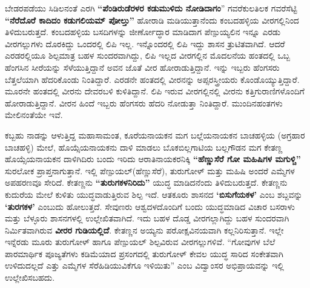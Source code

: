 ಬೇಡರಪಡೆಯು ಸಿಡಿಲನಂತೆ ಎರಗಿ \textbf{“ಪೆಂಡಿರುಡೆರಳರ ಕಡುಮುಳಿದು ನೋಡಿದಾಗಂ}” ಗವರೆಕುಲತಿಲಕ ಗವರೆಸೆಟ್ಟಿ \textbf{“ನೆರೆದೊರೆ ಕಾದಿದಂ ಕಡುಗಲಿಯಮ್ ಪೋಲ್ತು”} ಹೋರಾಡಿ ಮಡಿಯುತ್ತಾನೆಂದು ಕಂಬದಹಳ್ಳಿಯ ವೀರಗಲ್ಲಿನಿಂದ ತಿಳಿದು\-ಬರುತ್ತದೆ. ಕಂಬದಹಳ್ಳಿಯ ಬಸದಿಗಳನ್ನು ಜೀರ್ಣೋದ್ಧಾರ ಮಾಡಿದಾಗ ಪೆಣ್ಪುಯ್ಯಲಿನ ಇನ್ನೂ ಎರಡು ವೀರಗಲ್ಲುಗಳು ದೊರಕಿದ್ದು ಒಂದರಲ್ಲಿ ಲಿಪಿ ಇಲ್ಲ. ಇನ್ನೊಂದರಲ್ಲಿ ಲಿಪಿ ಇದ್ದು ಶಾಸನ ತ್ರುಟಿತವಾಗಿದೆ. ಆದರೆ ಎರಡರಲ್ಲಿಯೂ ಶಿಲ್ಪಮಾತ್ರ ಬಹಳ ಸುಂದರವಾಗಿದ್ದು, ಲಿಪಿ ಇಲ್ಲದ ವೀರಗಲ್ಲಿನ ಮೊದಲನೆಯ ಹಂತದಲ್ಲಿ ಒಬ್ಬ ಹೆಂಗಸಿನ ಸೀರೆಯನ್ನು ಸೆಳೆಯುತ್ತಿದ್ದಾನೆ ಅವನ ಜೊತೆ ವೀರ ಹೋರಾಡುತ್ತಿದ್ದಾನೆ. ಇನ್ನು ಇಬ್ಬರು ಹೆಂಗಸರು ಬೆತ್ತಲೆಯಾಗಿ ಹೆದರಿಕೊಂಡು ನಿಂತಿದ್ದಾರೆ. ಎರಡನೇ ಹಂತದಲ್ಲಿ ವೀರನನ್ನು ಅಪ್ಸರಸ್ತ್ರೀಯರು ಕೊಂಡೊಯ್ಯುತ್ತಿದ್ದಾರೆ. ಮೂರನೇ ಹಂತದಲ್ಲಿ ವೀರನು ದೇವರಬಳಿ ಕುಳಿತಿದ್ದಾನೆ. ಲಿಪಿ ಇರುವ ವೀರಗಲ್ಲಿನಲ್ಲಿ ವೀರನು ಕತ್ತಿಗುರಾಣಿಗಳೊಂದಿಗೆ ಹೋರಾಡುತ್ತಿದ್ದಾನೆ. ವೀರನ ಹಿಂದೆ ಇಬ್ಬರು ಹೆಂಗಸರು ಹೆದರಿ ನೋಡುತ್ತಾ ನಿಂತಿದ್ದಾರೆ. ಮುಂದಿನಹಂತಗಳು ಮೇಲಿನಂತೆಯೇ ಇವೆ.

ಕಬ್ಬಹು ನಾಡನ್ನು ಆಳುತ್ತಿದ್ದ ಮಹಾಸಾಮಂತ, ಕೂರೆಯನಾಯಕನ ಮಗ ಬಲ್ಲೆಯನಾಯಕನ ಬಾಚಹಳ್ಳಿಯ (ಅಗ್ರಹಾರ ಬಾಚಹಳ್ಳಿ) ಮೇಲೆ, ಹೊಯ್ಸೆಯನಾಯಕನು ದಾಳಿ ಮಾಡಲು ಬೊಕಬಿಲ್ಲಗಾಟಿಯ ಬಲ್ಲಗೌಡನ ಮಗ ಕೇತಣ್ಣ ಹೊಯ್ಸೆಯನಾಯಕನ ದಾಳಿಗಿದಿರು ಬಂದು ಇರಿದು ಆರಾತಿನಾಯಕರನಿಕ್ಕಿ \textbf{“ಹೆಣ್ಣುಸೆರೆ ಗೋ ಮಹಿಷಿಗಳ ಮಗುಳ್ಚಿ”} ಸುರಲೋಕ ಪ್ರಾಪ್ತನಾಗುತ್ತಾನೆ. ಇಲ್ಲಿ ಪೆಣ್ಪುಯಲ್​(ಹೆಣ್ಣುಸೆರೆ), ತುರುಗೋಳ್​ ಮತ್ತು ಮಹಿಷಿ ಅಂದರೆ ಎಮ್ಮೆಗಳ ಅಪಹರಣವೂ ಸೇರಿದೆ. ಕೇತಣ್ಣನು \textbf{“ತುರುಗಕಳನಿರಿದು”} ಯುದ್ಧ ಮಾಡಿದನೆಂದು ತಿಳಿದುಬರುತ್ತದೆ. ಕೇತಣ್ಣನು ಕುದುರೆಯ ಮೇಲೆ ಕುಳಿತು ಯುದ್ಧವಾಡುತ್ತಿರುವ ಶಿಲ್ಪ ಇದೆ. ಆತಕೂರು ಶಾಸನದ \textbf{‘ಬಿಸುಗೆಯಕಳ’} ಎಂಬ ಶಬ್ದವನ್ನು \textbf{‘ತುರಗಕಳ’} ಎಂಬುದು ಹೋಲುತ್ತದೆ. ಸೇವುಣರು ಆಶ್ವದಳದೊಂದಿಗೆ ಬಂದು ಯುದ್ಧಮಾಡಿದ ವಿಚಾರ ಬಸರಾಳು ಮತ್ತು ಬೆಳ್ಳೂರು ಶಾಸನಗಳಲ್ಲಿ ಉಲ್ಲೇಖಿತವಾಗಿದೆ. ಇದು ಬಹಳ ದೊಡ್ಡ ವೀರಗಲ್ಲಾಗಿದ್ದು ಬಹಳ ಸುಂದರವಾಗಿ ನಿರ್ಮಿತವಾಗಿರುವ \textbf{ವೀರರ ಗುಡಿಯಲ್ಲಿದೆ}. ಕೇತಣ್ಣನ ಅಯ್ಯನು ಪರೋಕ್ಷವಿನಯವಾಗಿ ಕಲ್ಲನಿರಿಸುತ್ತಾನೆ. ಇಲ್ಲೇ ಇನ್ನೆರಡು ಮೂರು ತುರುಗೋಳ್​ ಹಾಗೂ ಪೆಣ್ಪುಯಲ್​ ಶಿಲ್ಪವಿರುವ ವೀರಗಲ್ಲುಗಳಿವೆ. “ಗೋವುಗಳ ಬೆಲೆ ಪಾರಮಾರ್ಥಿಕ ಪೂಜ್ಯತೆಗಳು ಕಡಿಮೆಯಾದ ಪ್ರಸಂಗದಲ್ಲಿ ತುರುಗೋಳ್​ ಕೇವಲ ಯುದ್ಧ ಸಾರಿದ ಸಂಕೇತವಾಗಿ ಉಳಿದುದಲ್ಲದೆ ಎತ್ತು ಎಮ್ಮೆಗಳ ಸೆರೆಹಿಡಿಯುವಿಕೆಗೂ ಇಳಿಯಿತು” ಎಂಬ ವಿದ್ವಾಂಸರ ಅಭಿಪ್ರಾಯವನ್ನು ಇಲ್ಲಿ ಉಲ್ಲೇಖಿಸಬಹದು.

